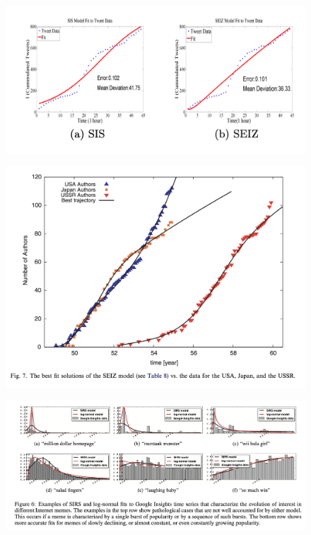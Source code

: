 \newpage


\begin{figure}[!ht] \centering  %
	\caption{\href{https://people.cs.vt.edu/ramakris/papers/news-rumor-epi-snakdd13.pdf}{\cite{jin2013epidemiological}}}
	\label{fig:news_curve}
	\centerline{\includegraphics[width=\textwidth]{./figures/Obama.png}}

\end{figure}


\newpage
\begin{figure}[!ht] \centering  %
	\caption{\href{http://web.mit.edu/dikaiser/www/BAKC.PhysA.pdf}{\cite{bettencourt2006power}}}
	\label{fig:science_ideas_curve}
	\centerline{\includegraphics[width=\textwidth]{./figures/Feynman.png}}

\end{figure}


\newpage
\begin{figure}[!ht] \centering  %
	\caption{\href{https://github.com/iworld1991/EpiExp/blob/master/Literature/bauckhage2011insights.pdf}{\cite{bauckhage2011insights}}}
	\label{fig:memes_curve}
	\centerline{\includegraphics[width=\textwidth]{./figures/Memes.png}}

\end{figure}
